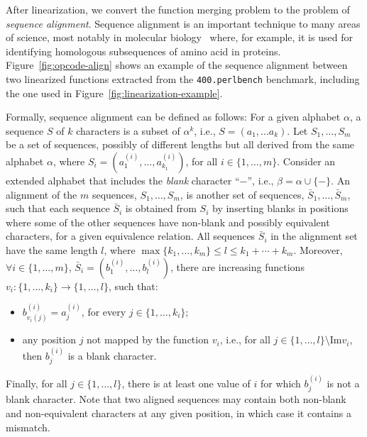 After linearization, we convert the function merging problem to the problem of \textit{sequence alignment}. Sequence alignment is an
important technique to many areas of science, most notably in molecular biology~\cite{needleman70,smith81,carrillo88,wang94} where, for
example, it is used for identifying homologous subsequences of amino acid in proteins. Figure~\ref{fig:opcode-align} shows an example of
the sequence alignment between two linearized functions extracted from the \texttt{400.perlbench} benchmark, including the one used in
Figure~\ref{fig:linearization-example}.

Formally, sequence alignment can be defined as follows:
For a given alphabet $\alpha$, a sequence $S$ of $k$ characters is a subset of
$\alpha^k$, i.e., $S = (a_1, \ldots a_k)$.
Let $S_1, \ldots, S_m$ be a set of sequences, possibly of different lengths but
all derived from the same alphabet $\alpha$, where
$S_i = (a_1^{(i)}, \ldots, a_{k_1}^{(i)})$, for all $i\in\{1,\ldots,m\}$.
Consider an extended alphabet that includes the \textit{blank} character ``$-$'',
i.e., $\beta = \alpha \cup \{-\}$.
An alignment of the $m$ sequences, $S_1, \ldots, S_m$, is another set of sequences,
$\bar{S}_1, \ldots, \bar{S}_m$, such that each sequence $\bar{S}_i$ is obtained
from $S_i$ by inserting blanks in positions where some of the other sequences
have non-blank and possibly equivalent characters, for a given equivalence relation.
All sequences $\bar{S}_i$ in the alignment set have the same length $l$, where
$\max\{k_1,\ldots,k_m\} \leq l \leq k_1 + \cdots + k_m$.
Moreover, $\forall i\in\{1,\ldots, m\}$, $\bar{S}_i = (b_1^{(i)},\ldots,b_l^{(i)})$,
there are increasing functions $v_i: \{1,\ldots,k_i\} \to \{1,\ldots,l\}$, such that:
\begin{itemize}[noitemsep,topsep=0pt]
\item $b_{v_i(j)}^{(i)} = a_j^{(i)}$, for every $j \in \{1,\ldots,k_i\}$;
\item any position $j$ not mapped by the function $v_i$, i.e.,
for all $j \in \{1,\ldots,l\}\setminus \textrm{Im} v_i$,
then $b_j^{(i)}$ is a blank character.
\end{itemize}
Finally, for all $j\in\{1,\ldots,l\}$, there is at least one value of $i$ for
which $b_j^{(i)}$ is not a blank character.
Note that two aligned sequences may contain both non-blank and non-equivalent characters at any given position, in which case it contains a
mismatch. 

